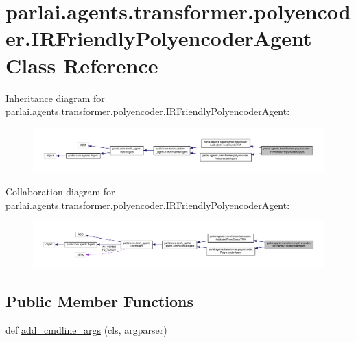 \hypertarget{classparlai_1_1agents_1_1transformer_1_1polyencoder_1_1IRFriendlyPolyencoderAgent}{}\section{parlai.\+agents.\+transformer.\+polyencoder.\+I\+R\+Friendly\+Polyencoder\+Agent Class Reference}
\label{classparlai_1_1agents_1_1transformer_1_1polyencoder_1_1IRFriendlyPolyencoderAgent}


Inheritance diagram for parlai.\+agents.\+transformer.\+polyencoder.\+I\+R\+Friendly\+Polyencoder\+Agent\+:
\nopagebreak
\begin{figure}[H]
\begin{center}
\leavevmode
\includegraphics[width=350pt]{classparlai_1_1agents_1_1transformer_1_1polyencoder_1_1IRFriendlyPolyencoderAgent__inherit__graph}
\end{center}
\end{figure}


Collaboration diagram for parlai.\+agents.\+transformer.\+polyencoder.\+I\+R\+Friendly\+Polyencoder\+Agent\+:
\nopagebreak
\begin{figure}[H]
\begin{center}
\leavevmode
\includegraphics[width=350pt]{classparlai_1_1agents_1_1transformer_1_1polyencoder_1_1IRFriendlyPolyencoderAgent__coll__graph}
\end{center}
\end{figure}
\subsection*{Public Member Functions}
\begin{DoxyCompactItemize}
\item 
def \hyperlink{classparlai_1_1agents_1_1transformer_1_1polyencoder_1_1IRFriendlyPolyencoderAgent_afbf30376e853d1a5f9a52b1ae3453aa2}{add\+\_\+cmdline\+\_\+args} (cls, argparser)
\end{DoxyCompactItemize}
